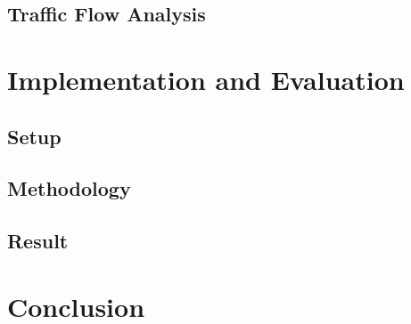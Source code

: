 \documentclass[conference]{IEEEtran}
\begin{document}
	

	\subsection{Traffic Flow Analysis}
	
	
	
\section{Implementation and Evaluation}
	\subsection{Setup}
	\subsection{Methodology}
	\subsection{Result}



\section{Conclusion}
\end{document}

